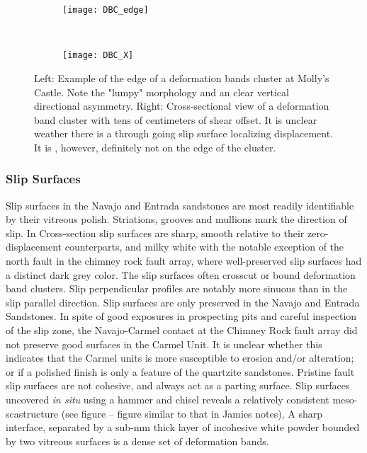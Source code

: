 \documentclass[12pt,a4paper]{article}
\begin{document}
 \begin{figure}[H]
	\centering
	\begin{subfigure}[b]{0.4\textwidth}
		\texttt{[image: DBC\_edge]}
	\end{subfigure}
	~
	\begin{subfigure}[b]{0.4\textwidth}
		\texttt{[image: DBC\_X]}
	\end{subfigure}
	\caption{Left: Example of the edge of a deformation bands cluster at Molly's Castle. Note the "lumpy" morphology and an clear vertical directional asymmetry. Right: Cross-sectional view of a deformation band cluster with tens of centimeters of shear offset. It is unclear weather there is a through going slip surface localizing displacement. It is , however, definitely not on the edge of the cluster.}
	\label{DBC}
\end{figure}		


\subsubsection{Slip Surfaces}

Slip surfaces in the Navajo and Entrada sandstones are most readily identifiable by their vitreous polish.  Striations, grooves and mullions mark the direction of slip. In Cross-section slip surfaces are sharp, smooth relative to their zero-displacement counterparts, and milky white with the notable exception of the north fault in the chimney rock fault array, where well-preserved slip surfaces had a distinct dark grey color.  The slip surfaces often crosscut or bound deformation band clusters. Slip perpendicular profiles are notably more sinuous than in the slip parallel direction. Slip surfaces are only preserved in the Navajo and Entrada Sandstones. In spite of good exposures in prospecting pits and careful inspection of the slip zone, the Navajo-Carmel contact at the Chimney Rock fault array did not preserve good surfaces in the Carmel Unit. It is unclear whether this indicates that the Carmel units is more susceptible to erosion and/or alteration; or if a polished finish is only a feature of the quartzite sandstones. Pristine fault slip surfaces are not cohesive, and always act as a parting surface. Slip surfaces uncovered \textit{in situ} using a hammer and chisel reveals a relatively consistent meso-scastructure (see figure – figure similar to that in Jamies notes), A sharp interface, separated by a sub-mm thick layer of incohesive white powder bounded by two vitreous surfaces is a dense set of deformation bands. 
\end{document}
